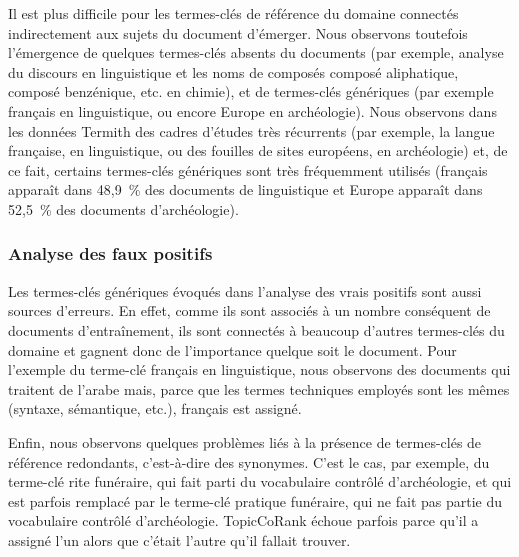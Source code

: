         Il est plus difficile pour les termes-clés de référence du domaine
        connectés indirectement aux sujets du document d'émerger. Nous observons
        toutefois l'émergence de quelques termes-clés absents du documents
        (par exemple, \og{}analyse du discours\fg{} en linguistique et
        les noms de composés \og{}composé aliphatique\fg{}, \og{}composé
        benzénique\fg{}, etc. en chimie), et de termes-clés génériques (par
        exemple \og{}français\fg{} en linguistique, ou encore \og{}Europe\fg{}
        en archéologie). Nous observons dans les données Termith des cadres
        d'études très récurrents (par exemple, la langue française, en
        linguistique, ou des fouilles de sites européens, en archéologie) et, de
        ce fait, certains termes-clés génériques sont très fréquemment utilisés
        (\og{}français\fg{} apparaît dans 48,9~\% des documents de linguistique
        et \og{}Europe\fg{} apparaît dans 52,5~\% des documents d'archéologie).

      \subsubsection{Analyse des faux positifs}
      \label{subsec:main-domain_specific_keyphrase_annotation-supervised_automatic_keyphrase_annotation-error_analysis-false_positives}
        Les termes-clés génériques évoqués dans l'analyse des vrais positifs
        sont aussi sources d'erreurs. En effet, comme ils sont associés à un
        nombre conséquent de documents d'entraînement, ils sont connectés à
        beaucoup d'autres termes-clés du domaine et gagnent donc de l'importance
        quelque soit le document. Pour l'exemple du terme-clé \og{}français\fg{}
        en linguistique, nous observons des documents qui traitent de l'arabe
        mais, parce que les termes techniques employés sont les mêmes
        (\og{}syntaxe\fg{}, \og{}sémantique\fg{}, etc.), \og{}français\fg{} est
        assigné.

        Enfin, nous observons quelques problèmes liés à la présence de
        termes-clés de référence redondants, c'est-à-dire des synonymes. C'est
        le cas, par exemple, du terme-clé \og{}rite funéraire\fg{}, qui fait
        parti du vocabulaire contrôlé d'archéologie, et qui est parfois remplacé
        par le terme-clé \og{}pratique funéraire\fg{}, qui ne fait pas partie du
        vocabulaire contrôlé d'archéologie. TopicCoRank échoue parfois parce
        qu'il a assigné l'un alors que c'était l'autre qu'il fallait trouver.

